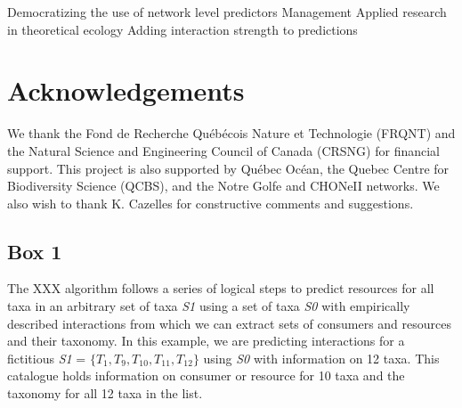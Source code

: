 \documentclass[letterpaper]{article}
\begin{document}
Democratizing the use of network level predictors
Management
Applied research in theoretical ecology
Adding interaction strength to predictions












\section{Acknowledgements}
We thank the Fond de Recherche Québécois Nature et Technologie (FRQNT) and the Natural Science and Engineering Council of Canada (CRSNG) for financial support. This project is also supported by Québec Océan, the Quebec Centre for Biodiversity Science (QCBS), and the Notre Golfe and CHONeII networks. We also wish to thank K. Cazelles for constructive comments and suggestions.

\newpage
\subsection{Box 1}
The XXX algorithm follows a series of logical steps to predict resources for all taxa in an arbitrary set of taxa \textit{S1} using a set of taxa \textit{S0} with empirically described interactions from which we can extract sets of consumers and resources and their taxonomy. In this example, we are predicting interactions for a fictitious \textit{S1}
 = $\{T_1, T_9, T_{10},T_{11}, T_{12}\}$ using \textit{S0} with information on 12 taxa. This catalogue holds information on consumer or resource for 10 taxa and the taxonomy for all 12 taxa in the list.
\end{document}
